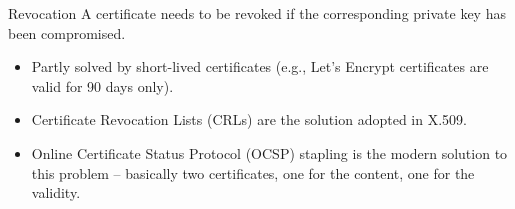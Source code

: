 \documentclass[aspectratio=169, lualatex,  10pt,dvipsnames,svgnames]{beamer} %
\def\envert#1{\textcolor{vert}{#1}}
\begin{document}
\begin{frame}{Revocation}
    \vspace{-0.45cm}
    A certificate needs to be revoked if the corresponding private key has been compromised.\bigskip
    \begin{itemize}
    \item   Partly solved by short-lived certificates (e.g., Let's Encrypt certificates are valid for 90 days only).\bigskip\pause
      
    \item   Certificate Revocation Lists (CRLs) are the solution adopted in X.509.\bigskip\pause
      
    \item Online Certificate Status Protocol (OCSP) stapling is the modern solution to this problem \envert{ -- basically two certificates, one for the content, one for the validity}. \pause
    \end{itemize}

  \end{frame}
\end{document}
